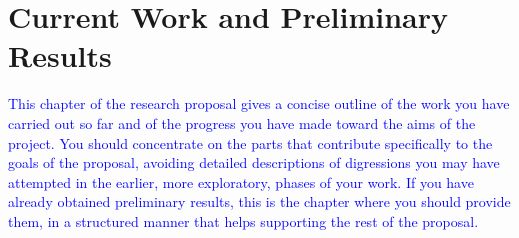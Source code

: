 \chapter{Current Work and Preliminary Results}
\label{ch:current-work}


\textcolor{blue}{This chapter of the research proposal gives a concise outline of the work you have 
carried out so far and of the progress you have made toward the aims of the project. You 
should concentrate on the parts that contribute specifically to the goals of the proposal, 
avoiding detailed descriptions of digressions you may have attempted in the earlier, 
more exploratory, phases of your work. If you have already obtained preliminary 
results, this is the chapter where you should provide them, in a structured manner that 
helps supporting the rest of the proposal.}
